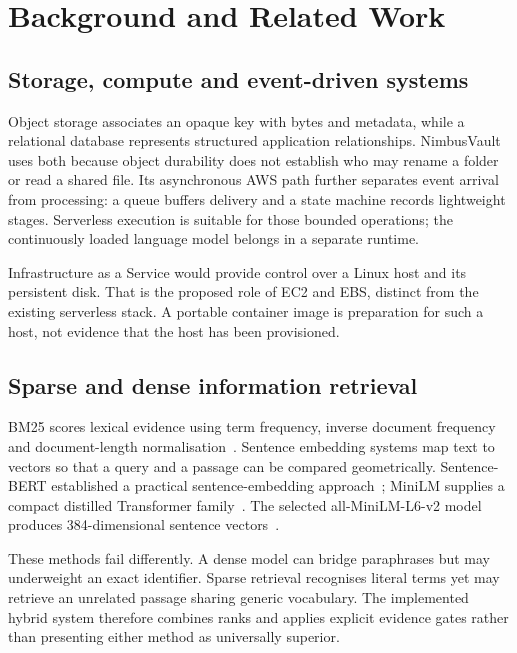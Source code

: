 \chapter{Background and Related Work}
\section{Storage, compute and event-driven systems}
Object storage associates an opaque key with bytes and metadata, while a relational database represents structured application relationships. NimbusVault uses both because object durability does not establish who may rename a folder or read a shared file. Its asynchronous AWS path further separates event arrival from processing: a queue buffers delivery and a state machine records lightweight stages. Serverless execution is suitable for those bounded operations; the continuously loaded language model belongs in a separate runtime.

Infrastructure as a Service would provide control over a Linux host and its persistent disk. That is the proposed role of EC2 and EBS, distinct from the existing serverless stack. A portable container image is preparation for such a host, not evidence that the host has been provisioned.
\section{Sparse and dense information retrieval}
BM25 scores lexical evidence using term frequency, inverse document frequency and document-length normalisation~\cite{bm25}. Sentence embedding systems map text to vectors so that a query and a passage can be compared geometrically. Sentence-BERT established a practical sentence-embedding approach~\cite{sbert}; MiniLM supplies a compact distilled Transformer family~\cite{minilm}. The selected all-MiniLM-L6-v2 model produces 384-dimensional sentence vectors~\cite{minilmcard}.

These methods fail differently. A dense model can bridge paraphrases but may underweight an exact identifier. Sparse retrieval recognises literal terms yet may retrieve an unrelated passage sharing generic vocabulary. The implemented hybrid system therefore combines ranks and applies explicit evidence gates rather than presenting either method as universally superior.
